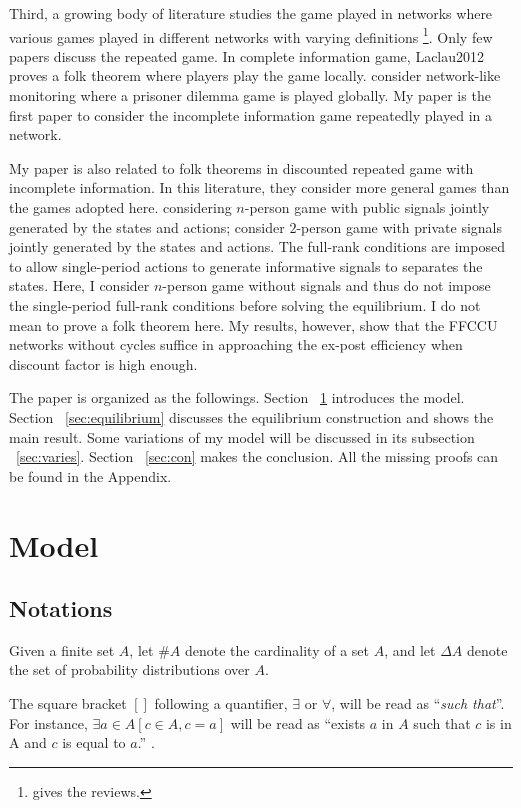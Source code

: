 \documentclass[12pt,letterpaper]{article}
\newtheorem*{main result}{Main Result}
\theoremstyle{definition}
\theoremstyle{remark}
\theoremstyle{claim}
\begin{document}
Third, a growing body of literature studies the game played in networks where various games played in different networks with varying definitions \footnote{\citep{Jackson2008}\citep{Goyal2012} gives the reviews.}. Only few papers discuss the repeated game. In complete information game, Laclau2012 proves a folk theorem where players play the game locally. \citep{Wolitzky2013} \citep{Wolitzky2014} consider network-like monitoring where a prisoner dilemma game is played globally. My paper is the first paper to consider the incomplete information game repeatedly played in a network. 


My paper is also related to folk theorems in discounted repeated game with incomplete information. In this literature, they consider more general games than the games adopted here. \citep{Fudenberg2010} \citep{Fudenberg2011} \citep{Wiseman2012}  considering $n$-person game with public signals jointly generated by the states and actions; \citep{Yamamoto2014} consider $2$-person game with private signals jointly generated by the states and actions. The full-rank conditions are imposed to allow single-period actions to generate informative signals to separates the states. Here, I consider $n$-person game without signals and thus do not impose the single-period full-rank conditions before solving the equilibrium. I do not mean to prove a folk theorem here. My results, however, show that the FFCCU networks without cycles suffice in approaching the ex-post efficiency when discount factor is high enough.


The paper is organized as the followings. Section ~\ref{sec:model} introduces the model. Section ~\ref{sec:equilibrium} discusses the equilibrium construction and shows the main result. Some variations of my model will be discussed in its subsection ~\ref{sec:varies}. Section ~\ref{sec:con} makes the conclusion. All the missing proofs can be found in the Appendix.

\section{Model}
\label{sec:model}
\subsection{Notations}
Given a finite set $A$, let $\#A$ denote the cardinality of a set $A$, and let $\Delta A$ denote the set of probability distributions over $A$. 

The square bracket $[]$ following a quantifier, $\exists$ or $\forall$, will be read as ``\textit{such that}''. For instance, $\exists a \in A [c\in A, c=a]$ will be read as ``exists $a$ in $A$ such that $c$ is in A and $c$ is equal to $a$.'' .
\end{document}
